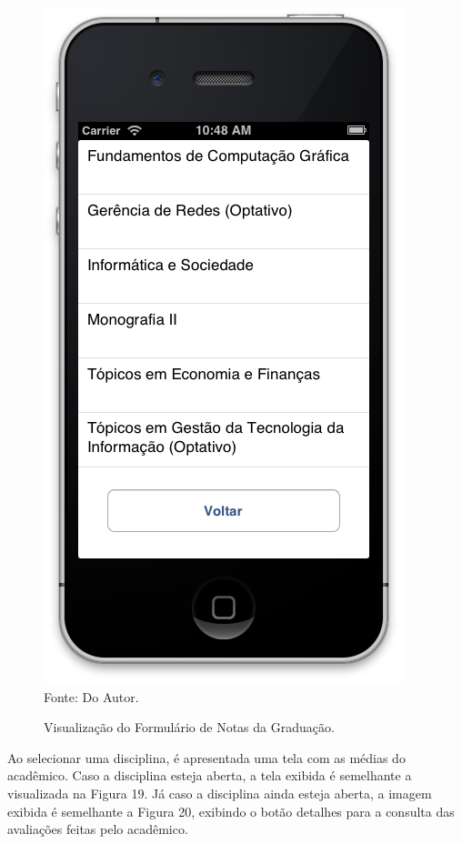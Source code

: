 \begin{figure}[!htb]
     \centering
     \caption[Formulário Notas da Graduação - Lista das Disciplinas]{Visualização do Formulário de Notas da Graduação.}
     \includegraphics[scale=0.34]{imagens/formnotasgraduacao.png}
     \\  Fonte: Do Autor.
\end{figure}
\newpage

Ao selecionar uma disciplina, é apresentada uma tela com as médias do acadêmico. Caso a disciplina esteja aberta, a tela exibida é semelhante a visualizada na Figura 19. Já caso a disciplina ainda esteja aberta, a imagem exibida é semelhante a Figura 20, exibindo o botão detalhes para a consulta das avaliações feitas pelo acadêmico.

